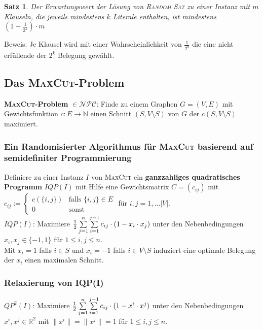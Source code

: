 \documentclass[a4paper,10pt]{scrartcl}
\newcommand{\tbf}{\textbf}
\newcommand{\tsc}{\textsc}
\newcommand{\Ree}{\mathbb{R}}
\newcommand{\Gr}{$G = (V,E)$ }
\newcommand{\Gwfktn}{$c: E \rightarrow \mathbb{N}$ }
\newcommand{\Cut}{$(S,V \setminus S)$ }
\newcommand{\NPC}{\mathcal{NPC}}
\newtheorem{satz}{Satz}
\begin{document}
\begin{satz}
 Der Erwartungswert der Lösung von \tsc{Random Sat} zu einer Instanz mit $m$ Klauseln, die jeweils mindestens $k$ Literale enthalten, ist mindestens $(1 - \frac{1}{2^k}) \cdot m$
\end{satz}

Beweis: Je Klausel wird mit einer  Wahrscheinlichkeit von $\frac{1}{2^k}$ die eine nicht erfüllende der $2^k$ Belegung gewählt. \\

\subsection{Das \tsc{MaxCut}-Problem}
\tbf{\tsc{MaxCut}-Problem} $\in \NPC$: Finde zu einem Graphen \Gr mit Gewichtsfunktion \Gwfktn einen Schnitt \Cut von $G$ der $c(S,V \setminus S)$ maximiert. \\

\subsubsection{Ein Randomisierter Algorithmus für \tsc{MaxCut} basierend auf semidefiniter Programmierung}
Definiere zu einer Instanz $I$ von \tsc{MaxCut} ein \tbf{ganzzahliges quadratisches Programm} $IQP(I)$ mit Hilfe eine Gewichtsmatrix $C = (c_{ij})$ mit $c_{ij} := \begin{cases} c(\{i,j\}) & \text{falls } \{i,j\} \in E \\ 0 & \text{sonst}\end{cases}$ für $i,j = 1, \ldots |V|$. \\

$IQP(I)$: Maximiere $\frac{1}{2} \sum_{j=1}^n \limits \sum_{i=1}^{j-1} \limits c_{ij} \cdot (1 - x_i \cdot x_j)$ unter den Nebenbedingungen $x_i,x_j \in \{-1,1\}$ für $1 \leq i,j \leq n$. \\

Mit $x_i = 1$ falls $i \in S$ und $x_i = -1$ falls $i \in V \setminus S$ induziert eine optimale Belegung der $x_i$ einen maximalen Schnitt. \\

\subsubsection{Relaxierung von IQP(I)}
$QP^2(I)$: Maximiere $\frac{1}{2} \sum_{j=1}^n \limits \sum_{i=1}^{j-1} \limits c_{ij} \cdot (1 - x^i \cdot x^j)$ unter den Nebenbedingungen $x^i,x^j \in \Ree^2$ mit $\lVert x^i \rVert = \lVert x^j \rVert = 1$ für $1 \leq i,j \leq n$. \\
\end{document}

